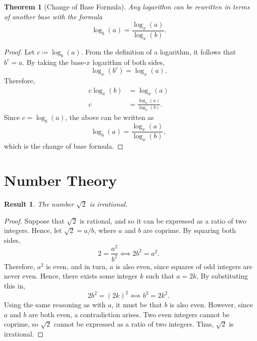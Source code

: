 \documentclass[headings=standardclasses]{scrartcl}
\newtheorem{theorem}{Theorem}
\newtheorem{result}{Result}
\theoremstyle{definition}
\begin{document}
\begin{theorem}[Change of Base Formula]
  Any logarithm can be rewritten in terms of another base with the formula
  \[ \log_{b}(a) = \frac{\log_{x}(a)}{\log_{x}(b)}. \]
\end{theorem}

\begin{proof}
  Let \(c ≔ \log_b(a)\). From the definition of a logarithm, it follows
  that \(b^c = a\). By taking the base-\(x\) logarithm of both sides,
  \begin{equation*}
      \log_x(b^c) = \log_x(a).
  \end{equation*}
  Therefore,
  \begin{align*}
      c\log_x(b) &= \log_x(a) \\
               c &= \frac{\log_x(a)}{\log_x(b)}.
  \end{align*}
  Since \(c = \log_b(a)\), the above can be written as
  \begin{equation*}
    \log_b(a) = \frac{\log_x(a)}{\log_x(b)},
  \end{equation*}
  which is the change of base formula.
\end{proof}

\section*{Number Theory}

\begin{result}
  The number \(\sqrt{2}\) is irrational.
\end{result}

\begin{proof}
  Suppose that \(\sqrt{2}\) is rational, and so it can be expressed as a ratio
  of two integers. Hence, let \(\sqrt{2} = a/b\), where \(a\) and \(b\) are
  coprime. By squaring both sides,
  \begin{equation*}
    2 = \frac{a^2}{b^2} ⟺ 2b^2 = a^2.
  \end{equation*}
  Therefore, \(a^2\) is even, and in turn, \(a\) is also even, since squares of
  odd integers are never even. Hence, there exists some integer \(k\) such that
  \(a = 2k\). By substituting this in,
  \begin{equation*}
    2b^2 = {(2k)}^2 ⟺ b^2 = 2k^2.
  \end{equation*}
  Using the same reasoning as with \(a\), it must be that \(b\) is also even.
  However, since \(a\) and \(b\) are both even, a contradiction arises. Two
  even integers cannot be coprime, so \(\sqrt{2}\) cannot be expressed as a
  ratio of two integers. Thus, \(\sqrt{2}\) is irrational.
\end{proof}
\end{document}
